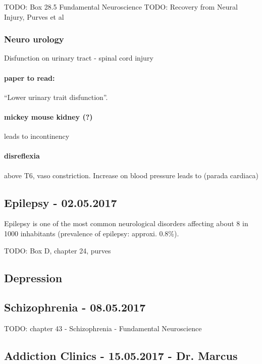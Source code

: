 \documentclass[12pt,article,oneside,a4paper]{memoir}
\begin{document}
TODO: Box 28.5 Fundamental Neuroscience
TODO: Recovery from Neural Injury, Purves et al
\subsubsection{Neuro urology}
Disfunction on urinary tract - spinal cord injury
\paragraph{paper to read:} ``Lower urinary trait disfunction''.

\paragraph{mickey mouse kidney (?)} leads to incontinency

\paragraph{disreflexia}  above T6, vaso constriction. Increase on blood pressure leads to (parada cardiaca)

\newpage
\subsection{Epilepsy - 02.05.2017}
Epilepsy is one of the most common neurological disorders affecting about 8 in 1000 inhabitants (prevalence of epilepsy: approxi. 0.8\%). 

TODO: Box D, chapter 24, purves

\subsection{Depression}

\newpage
\subsection{Schizophrenia - 08.05.2017}

TODO: chapter 43 - Schizophrenia - Fundamental Neuroscience
\newpage
\subsection{Addiction Clinics - 15.05.2017 - Dr. Marcus}
\end{document}
